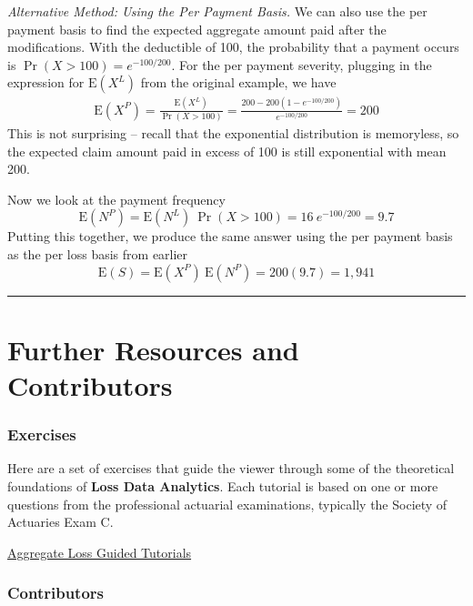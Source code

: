 \documentclass[]{book}
\theoremstyle{definition}
\theoremstyle{definition}
\theoremstyle{definition}
\theoremstyle{remark}
\begin{document}
\emph{Alternative Method: Using the Per Payment Basis.} We can also use
the per payment basis to find the expected aggregate amount paid after
the modifications. With the deductible of 100, the probability that a
payment occurs is \(\Pr(X > 100) = e^{-100/200}\). For the per payment
severity, plugging in the expression for \(\mathrm{E}(X^L)\) from the
original example, we have \[\begin{aligned}
\mathrm{E} (X^P) = \frac{\mathrm{E} (X^L)}{\Pr(X > 100)} = \frac{200 - 200(1-e^{-100/200})}{e^{-100/200}} = 200
\end{aligned}\] This is not surprising -- recall that the exponential
distribution is memoryless, so the expected claim amount paid in excess
of 100 is still exponential with mean 200.

Now we look at the payment frequency
\[\mathrm{E} (N^P) = \mathrm{E}(N^L)~\Pr(X>100) = 16 ~e^{-100/200} = 9.7\]
Putting this together, we produce the same answer using the per payment
basis as the per loss basis from earlier
\[\mathrm{E}(S) = \mathrm{E} (X^P)~ \mathrm{E} (N^P)= 200(9.7) = 1,941\]

\begin{center}\rule{0.5\linewidth}{\linethickness}\end{center}

\section{Further Resources and
Contributors}\label{AL-further-reading-and-resources}

\subsubsection{Exercises}\label{exercises-3}

Here are a set of exercises that guide the viewer through some of the
theoretical foundations of \textbf{Loss Data Analytics}. Each tutorial
is based on one or more questions from the professional actuarial
examinations, typically the Society of Actuaries Exam C.

\href{https://www.ssc.wisc.edu/~jfrees/loss-data-analytics/aggregate-loss-guided-tutorials/}{Aggregate
Loss Guided Tutorials}

\subsubsection*{Contributors}\label{contributors-4}
\end{document}
